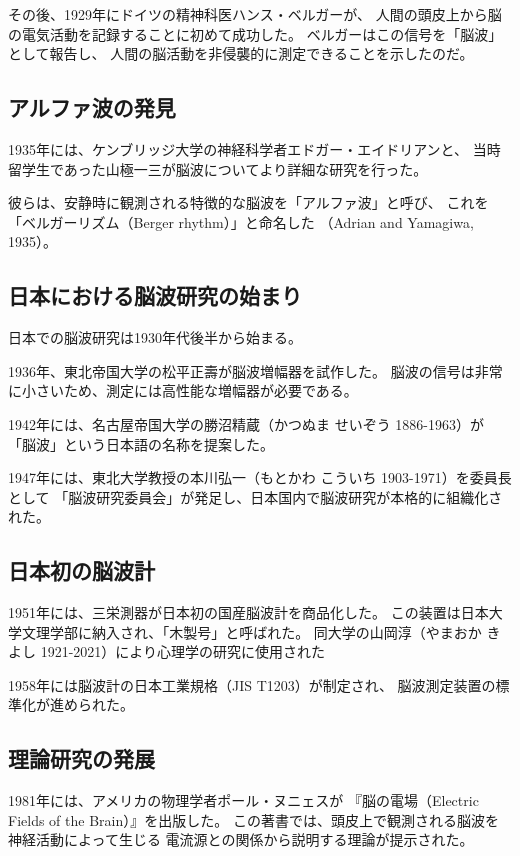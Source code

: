 その後、1929年にドイツの精神科医ハンス・ベルガーが、
人間の頭皮上から脳の電気活動を記録することに初めて成功した。
ベルガーはこの信号を「脳波」として報告し、
人間の脳活動を非侵襲的に測定できることを示したのだ。

\subsection{アルファ波の発見}

1935年には、ケンブリッジ大学の神経科学者エドガー・エイドリアンと、
当時留学生であった山極一三が脳波についてより詳細な研究を行った。

彼らは、安静時に観測される特徴的な脳波を「アルファ波」と呼び、
これを「ベルガーリズム（Berger rhythm）」と命名した
（Adrian and Yamagiwa, 1935）。

\subsection{日本における脳波研究の始まり}

日本での脳波研究は1930年代後半から始まる。

1936年、東北帝国大学の松平正壽が脳波増幅器を試作した。
脳波の信号は非常に小さいため、測定には高性能な増幅器が必要である。

1942年には、名古屋帝国大学の勝沼精蔵（かつぬま せいぞう 1886-1963）が
「脳波」という日本語の名称を提案した。

1947年には、東北大学教授の本川弘一（もとかわ こういち 1903-1971）を委員長として
「脳波研究委員会」が発足し、日本国内で脳波研究が本格的に組織化された。

\subsection{日本初の脳波計}

1951年には、三栄測器が日本初の国産脳波計を商品化した。
この装置は日本大学文理学部に納入され、「木製号」と呼ばれた。
同大学の山岡淳（やまおか きよし 1921-2021）により心理学の研究に使用された

1958年には脳波計の日本工業規格（JIS T1203）が制定され、
脳波測定装置の標準化が進められた。

\subsection{理論研究の発展}

1981年には、アメリカの物理学者ポール・ヌニェスが
『脳の電場（Electric Fields of the Brain）』を出版した。
この著書では、頭皮上で観測される脳波を神経活動によって生じる
電流源との関係から説明する理論が提示された。

